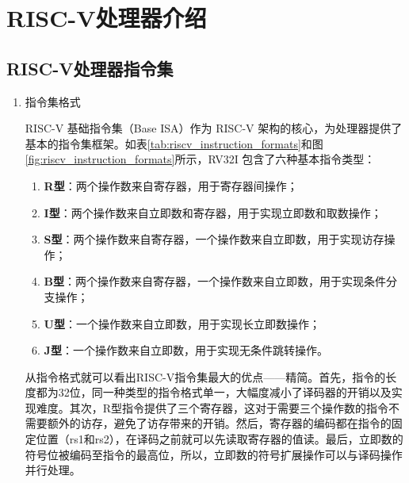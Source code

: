 
\chapter{RISC-V处理器介绍}

\section{RISC-V处理器指令集}

\begin{enumerate}[label={(\arabic*)},itemsep=0pt, parsep=0pt]
	\item 指令集格式

	      RISC-V 基础指令集（Base ISA）作为 RISC-V 架构的核心，为处理器提供了基本的指令集框架。如表\ref{tab:riscv_instruction_formats}和图\ref{fig:riscv_instruction_formats}所示，RV32I 包含了六种基本指令类型：
	      \begin{enumerate}[]
		      \item \textbf{R型}：两个操作数来自寄存器，用于寄存器间操作；
		      \item \textbf{I型}：两个操作数来自立即数和寄存器，用于实现立即数和取数操作；
		      \item \textbf{S型}：两个操作数来自寄存器，一个操作数来自立即数，用于实现访存操作；
		      \item \textbf{B型}：两个操作数来自寄存器，一个操作数来自立即数，用于实现条件分支操作；
		      \item \textbf{U型}：一个操作数来自立即数，用于实现长立即数操作；
		      \item \textbf{J型}：一个操作数来自立即数，用于实现无条件跳转操作。
	      \end{enumerate}

	      从指令格式就可以看出RISC-V指令集最大的优点——精简。首先，指令的长度都为32位，同一种类型的指令格式单一，大幅度减小了译码器的开销以及实现难度。其次，R型指令提供了三个寄存器，这对于需要三个操作数的指令不需要额外的访存，避免了访存带来的开销。然后，寄存器的编码都在指令的固定位置（rs1和rs2），在译码之前就可以先读取寄存器的值读。最后，立即数的符号位被编码至指令的最高位，所以，立即数的符号扩展操作可以与译码操作并行处理。


\end{enumerate}
